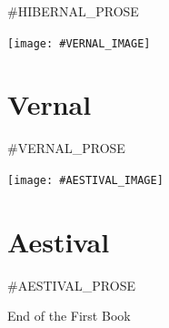 \documentclass{amsbook}
\begin{document}
#HIBERNAL_PROSE
\clearpage

\thispagestyle{empty}
\vspace*{\fill}
{\centering
\texttt{[image: \#VERNAL\_IMAGE]}}
\vspace*{\fill}
\clearpage

\chapter{Vernal}

\renewcommand{\poemone}{
\begin{figure}[p!]
\bigskip
\ding{72}
\bigskip
#VERNAL_POEM_1
\end{figure}
}
\renewcommand{\poemtwo}{
\begin{figure}[p!]
\bigskip
\ding{72}
\bigskip
#VERNAL_POEM_2
\end{figure}
}
\renewcommand{\poemthree}{
\begin{figure}[p!]
\bigskip
\ding{72}
\bigskip
#VERNAL_POEM_3
\end{figure}
}
\initprintpoems

#VERNAL_PROSE
\clearpage

\thispagestyle{empty}
\vspace*{\fill}
{\centering
\texttt{[image: \#AESTIVAL\_IMAGE]}}
\vspace*{\fill}
\clearpage

\chapter{Aestival}

\renewcommand{\poemone}{
\begin{figure}[p!]
\bigskip
\ding{72}
\bigskip
#AESTIVAL_POEM_1
\end{figure}
}
\renewcommand{\poemtwo}{
\begin{figure}[p!]
\bigskip
\ding{72}
\bigskip
#AESTIVAL_POEM_2
\end{figure}
}
\renewcommand{\poemthree}{
\begin{figure}[p!]
\bigskip
\ding{72}
\bigskip
#AESTIVAL_POEM_3
\end{figure}
}
\initprintpoems

#AESTIVAL_PROSE

\bigskip
\bigskip
\begin{center}
{\sc End of the First Book}
\end{center}
\end{document}
